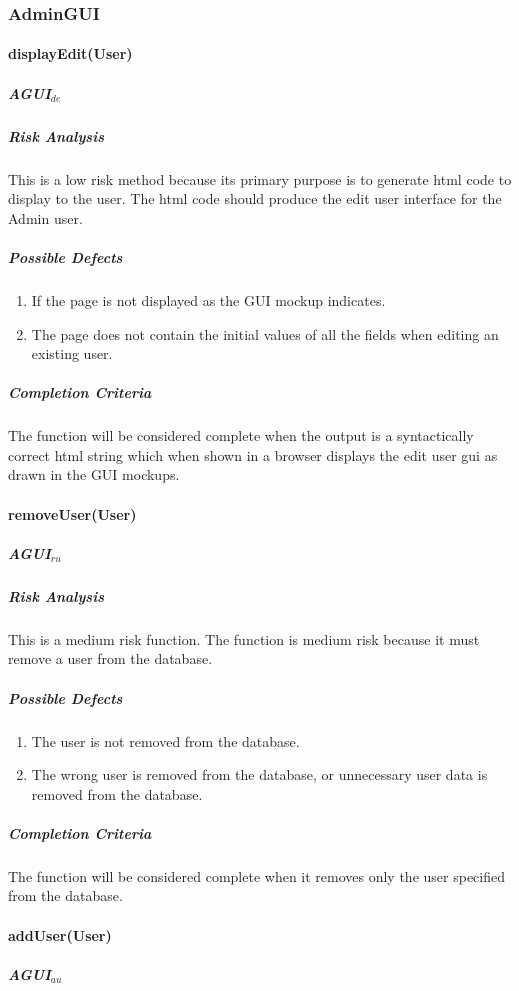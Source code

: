 \documentclass{article}
\begin{document}
\subsubsection{AdminGUI}

\paragraph{displayEdit(User)}

\subparagraph{AGUI$_{de}$}

\subparagraph{Risk Analysis}
This is a low risk method because its primary purpose is to generate html code to display to the user. The html code should produce the edit user interface for the Admin user.

\subparagraph{Possible Defects}
\begin{enumerate}
\item If the page is not displayed as the GUI mockup indicates.
\item The page does not contain the initial values of all the fields when editing an existing user.
\end{enumerate}

\subparagraph{Completion Criteria}
The function will be considered complete when the output is a syntactically correct html string which when shown in a browser displays the edit user gui as drawn in the GUI mockups.


\paragraph{removeUser(User)}
\subparagraph{AGUI$_{ru}$}

\subparagraph{Risk Analysis}
This is a medium risk function. The function is medium risk because it must remove a user from the database.

\subparagraph{Possible Defects}
\begin{enumerate}
\item The user is not removed from the database.
\item The wrong user is removed from the database, or unnecessary user data is removed from the database.
\end{enumerate}

\subparagraph{Completion Criteria}
The function will be considered complete when it removes only the user specified from the database.


\paragraph{addUser(User)}
\subparagraph{AGUI$_{au}$}
\end{document}
